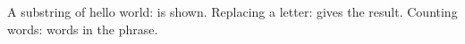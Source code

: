 \documentclass{article}
\begin{document}
A substring of hello world:  is shown.
Replacing a letter:  gives the result.
Counting words:  words in the phrase.
\end{document}
